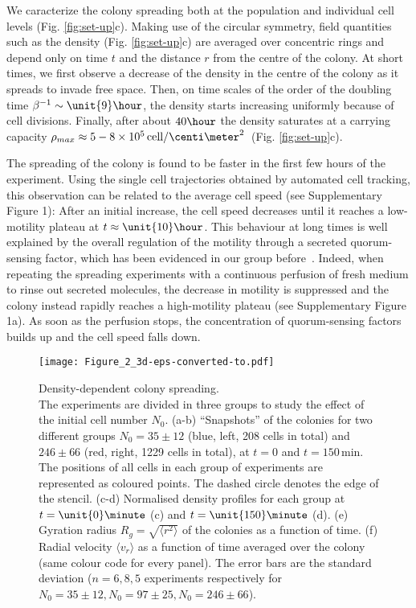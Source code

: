 \documentclass[11pt, twocolumn]{article}
\begin{document}
We caracterize the colony spreading both at the population and
individual cell levels (Fig. \ref{fig:set-up}c). Making use of the
circular symmetry, field quantities such as the density
(Fig. \ref{fig:set-up}c) are averaged over concentric rings and depend
only on time $t$ and the distance $r$ from the centre of the colony.
At short times, we first observe a decrease of the density in the
centre of the colony as it spreads to invade free space. Then, on time
scales of the order of the doubling time
$\beta^{-1}\sim\unit{9}\hour$, the density starts increasing uniformly
because of cell divisions. Finally, after about $40\hour$ the density
saturates at a carrying capacity
$\rho_{max}\approx 5-8\times
10^{5}\,\text{cell}/\centi\meter^{2}$~(Fig. \ref{fig:set-up}c).

The spreading of the colony is found to be faster in the first few
hours of the experiment. Using the single cell trajectories obtained
by automated cell tracking, this observation can be related to the
average cell speed (see Supplementary Figure 1): After an initial
increase, the cell speed decreases until it reaches a low-motility
plateau at $t\approx\unit{10}\hour$. This behaviour at long times is well explained
by the overall regulation of the motility through a secreted
quorum-sensing factor, which has been evidenced in our group
before~\cite{Gole2011}. Indeed, when repeating the spreading
experiments with a continuous perfusion of fresh medium to rinse out
secreted molecules, the decrease in motility is suppressed and the
colony instead rapidly reaches a high-motility plateau (see
Supplementary Figure 1a). As soon as the perfusion stops, the
concentration of quorum-sensing factors builds up and the cell speed
falls down.

\begin{figure*}[ht!]
\centering
\texttt{[image: Figure\_2\_3d-eps-converted-to.pdf]}

\caption{Density-dependent colony spreading.\\
  The experiments are divided in three groups to study the effect of
  the initial cell number $N_0$.  (a-b) ``Snapshots'' of the colonies
  for two different groups $N_0=35\pm12$ (blue, left, 208 cells in total) and
  $246\pm66$ (red, right, 1229 cells in total), at $t=0$ and $t=150\,$min. The positions of all cells in each group of
  experiments are represented as coloured points. The dashed circle
  denotes the edge of the stencil.  (c-d) Normalised density profiles
  for each group at $t=\unit{0}\minute$ (c) and $t=\unit{150}\minute$
  (d).  (e) Gyration radius $R_g=\sqrt{\langle r^2\rangle}$ of the
  colonies as a function of time.  (f) Radial velocity
  $\langle v_r\rangle$ as a function of time averaged over the colony
  (same colour code for every panel). The error bars are the standard
  deviation ($n=6, 8, 5$ experiments respectively for
  $N_0 = 35\pm12, N_0=97\pm25, N_0=246\pm66$).}
\label{fig:spread_N0}
\end{figure*}
\end{document}
